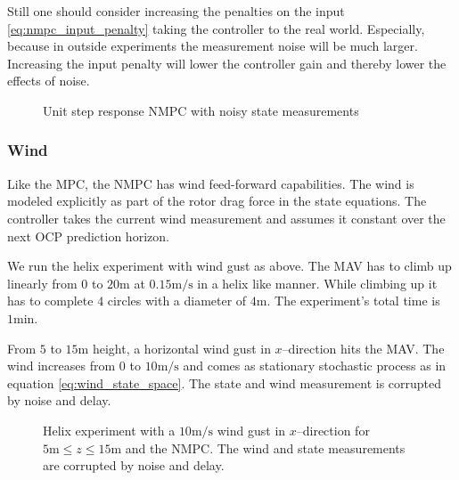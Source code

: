 Still one should consider increasing the penalties on the input \ref{eq:nmpc_input_penalty} taking the controller to the real world. Especially, because in outside experiments the measurement noise will be much larger. Increasing the input penalty will lower the controller gain and thereby lower the effects of noise.

\begin{figure}
\centering
{}
\qquad
{}
\caption{Unit step response NMPC with noisy state measurements}
\label{fig:nmpc_step_noisy}
\end{figure}


\subsubsection{Wind}
Like the MPC, the NMPC has wind feed-forward capabilities. The wind is modeled explicitly as part of the rotor drag force in the state equations. The controller takes the current wind measurement and assumes it constant over the next OCP prediction horizon.

We run the helix experiment with wind gust as above. The MAV has to climb up linearly from $0$ to $20 \si{\metre}$ at $0.15 \si{\metre\per\second}$ in a helix like manner. While climbing up it has to complete $4$ circles with a diameter of $4\si{\metre}$. The experiment's total time is $1 \si{\minute}$. 

From $5$ to $15 \si{\metre}$ height, a horizontal wind gust in $x$--direction hits the MAV. The wind increases from $0$ to $10 \si{\metre\per\second}$ and comes as stationary stochastic process as in equation \ref{eq:wind_state_space}. The state and wind measurement is corrupted by noise and delay.

\begin{figure}
\centering
{}
\qquad
{}
\caption{Helix experiment with a $10 \si{\metre\per\second}$ wind gust in $x$--direction for $5 \si{\metre} \leq z \leq 15 \si{\metre}$ and the NMPC. The wind and state measurements are corrupted by noise and delay.}
\label{fig:nmpc_helix}
\end{figure}


